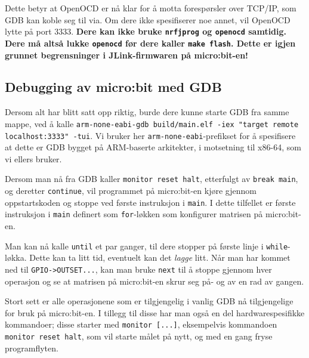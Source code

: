Dette betyr at OpenOCD er nå klar for å motta forespørsler over TCP/IP, som GDB kan koble seg til via. Om dere ikke spesifiserer noe annet, vil OpenOCD lytte på port 3333. \textcolor{RWTHrot100}{\textbf{Dere kan ikke bruke \texttt{nrfjprog} og \texttt{openocd} samtidig. Dere må altså lukke \texttt{openocd} før dere kaller \texttt{make flash}. Dette er igjen grunnet begrensninger i JLink-firmwaren på micro:bit-en!}}

\subsection{Debugging av micro:bit med GDB}

Dersom alt har blitt satt opp riktig, burde dere kunne starte GDB fra samme mappe, ved å kalle \verb|arm-none-eabi-gdb build/main.elf -iex "target remote| \verb| localhost:3333" -tui|. Vi bruker her \verb|arm-none-eabi|-prefikset for å spesifisere at dette er GDB bygget på ARM-baserte arkitekter, i motsetning til x86-64, som vi ellers bruker.



Dersom man nå fra GDB kaller \verb|monitor reset halt|, etterfulgt av \verb|break main|, og deretter \verb|continue|, vil programmet på micro:bit-en kjøre gjennom oppstartskoden og stoppe ved første instruksjon i \verb|main|. I dette tilfellet er første instruksjon i \verb|main| definert som \verb|for|-løkken som konfigurer matrisen på micro:bit-en.

Man kan nå kalle \verb|until| et par ganger, til dere stopper på første linje i \verb|while|-løkka. Dette kan ta litt tid, eventuelt kan det \textit{lagge} litt. Når man har kommet ned til \verb|GPIO->OUTSET...|, kan man bruke \verb|next| til å stoppe gjennom hver operasjon og se at matrisen på micro:bit-en skrur seg på- og av en rad av gangen.


Stort sett er alle operasjonene som er tilgjengelig i vanlig GDB nå tilgjengelige for bruk på micro:bit-en. I tillegg til disse har man også en del hardwarespesifikke kommandoer; disse starter med \verb|monitor [...]|, eksempelvis kommandoen \verb|monitor reset halt|, som vil starte målet på nytt, og med en gang fryse programflyten.